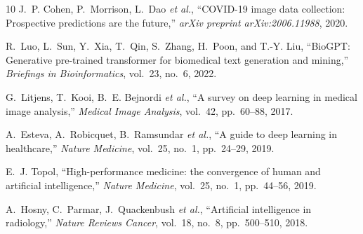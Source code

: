 \documentclass[conference]{IEEEtran}
\begin{document}
\begin{thebibliography}{10}
J.~P. Cohen, P.~Morrison, L.~Dao \textit{et al.}, ``COVID-19 image data collection: Prospective predictions are the future,'' \textit{arXiv preprint arXiv:2006.11988}, 2020.

R.~Luo, L.~Sun, Y.~Xia, T.~Qin, S.~Zhang, H.~Poon, and T.-Y. Liu, ``BioGPT: Generative pre-trained transformer for biomedical text generation and mining,'' \textit{Briefings in Bioinformatics}, vol.~23, no.~6, 2022.

G.~Litjens, T.~Kooi, B.~E. Bejnordi \textit{et al.}, ``A survey on deep learning in medical image analysis,'' \textit{Medical Image Analysis}, vol.~42, pp.~60--88, 2017.

A.~Esteva, A.~Robicquet, B.~Ramsundar \textit{et al.}, ``A guide to deep learning in healthcare,'' \textit{Nature Medicine}, vol.~25, no.~1, pp.~24--29, 2019.

E.~J. Topol, ``High-performance medicine: the convergence of human and artificial intelligence,'' \textit{Nature Medicine}, vol.~25, no.~1, pp.~44--56, 2019.

A.~Hosny, C.~Parmar, J.~Quackenbush \textit{et al.}, ``Artificial intelligence in radiology,'' \textit{Nature Reviews Cancer}, vol.~18, no.~8, pp.~500--510, 2018.

\end{thebibliography}
\end{document}
